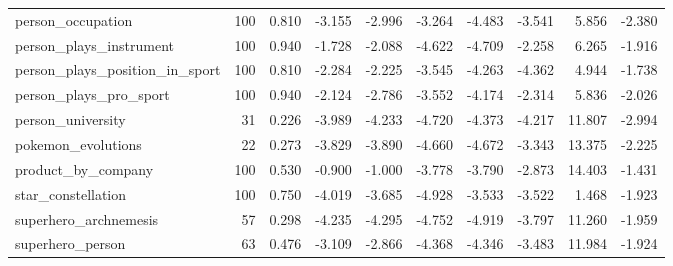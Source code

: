 \begin{table}[htbp]
{\begin{tabular}{lrrrrrrrrr}
person\_occupation & 100 & 0.810 & -3.155 & -2.996 & -3.264 & -4.483 & -3.541 & 5.856 & -2.380 \\
person\_plays\_instrument & 100 & 0.940 & -1.728 & -2.088 & -4.622 & -4.709 & -2.258 & 6.265 & -1.916 \\
person\_plays\_position\_in\_sport & 100 & 0.810 & -2.284 & -2.225 & -3.545 & -4.263 & -4.362 & 4.944 & -1.738 \\
person\_plays\_pro\_sport & 100 & 0.940 & -2.124 & -2.786 & -3.552 & -4.174 & -2.314 & 5.836 & -2.026 \\
person\_university & 31 & 0.226 & -3.989 & -4.233 & -4.720 & -4.373 & -4.217 & 11.807 & -2.994 \\
pokemon\_evolutions & 22 & 0.273 & -3.829 & -3.890 & -4.660 & -4.672 & -3.343 & 13.375 & -2.225 \\
product\_by\_company & 100 & 0.530 & -0.900 & -1.000 & -3.778 & -3.790 & -2.873 & 14.403 & -1.431 \\
star\_constellation & 100 & 0.750 & -4.019 & -3.685 & -4.928 & -3.533 & -3.522 & 1.468 & -1.923 \\
superhero\_archnemesis & 57 & 0.298 & -4.235 & -4.295 & -4.752 & -4.919 & -3.797 & 11.260 & -1.959 \\
superhero\_person & 63 & 0.476 & -3.109 & -2.866 & -4.368 & -4.346 & -3.483 & 11.984 & -1.924 \\
\bottomrule
\end{tabular}}
\end{table}
